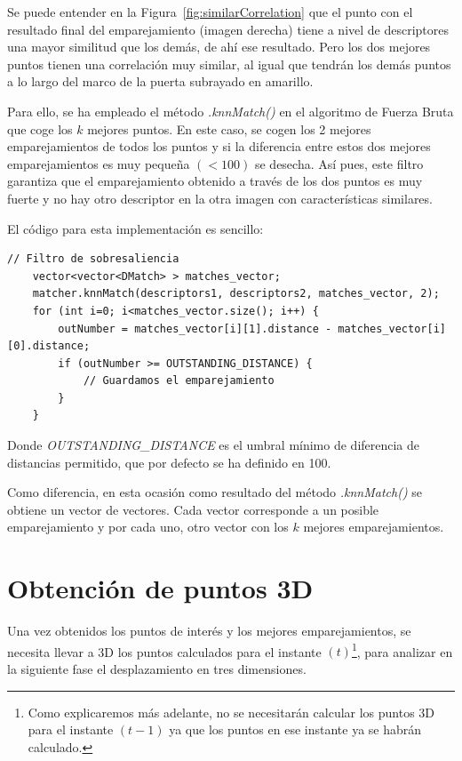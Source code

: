 \begin{itemize}
Se puede entender en la Figura~\ref{fig:similarCorrelation} que el punto con el resultado final del emparejamiento (imagen derecha) tiene a nivel de descriptores una mayor similitud que los demás, de ahí ese resultado. Pero los dos mejores puntos tienen una correlación muy similar, al igual que tendrán los demás puntos a lo largo del marco de la puerta subrayado en amarillo.

Para ello, se ha empleado el método \textit{.knnMatch()} en el algoritmo de Fuerza Bruta que coge los $k$ mejores puntos. En este caso, se cogen los 2 mejores emparejamientos de todos los puntos y si la diferencia entre estos dos mejores emparejamientos es muy pequeña $(< 100)$ se desecha. Así pues, este filtro garantiza que el emparejamiento obtenido a través de los dos puntos es muy fuerte y no hay otro descriptor en la otra imagen con características similares.

El código para esta implementación es sencillo:

\begin{lstlisting}[style=CStyle]
	// Filtro de sobresaliencia
	vector<vector<DMatch> > matches_vector;
	matcher.knnMatch(descriptors1, descriptors2, matches_vector, 2);
	for (int i=0; i<matches_vector.size(); i++) {
		outNumber = matches_vector[i][1].distance - matches_vector[i][0].distance;
		if (outNumber >= OUTSTANDING_DISTANCE) {
			// Guardamos el emparejamiento
		}
	}
\end{lstlisting}

Donde \textit{OUTSTANDING\_DISTANCE} es el umbral mínimo de diferencia de distancias permitido, que por defecto se ha definido en 100.

Como diferencia, en esta ocasión como resultado del método \textit{.knnMatch()} se obtiene un vector de vectores. Cada vector corresponde a un posible emparejamiento y por cada uno, otro vector con los $k$ mejores emparejamientos.

\end{itemize}

\section{Obtención de puntos 3D}

Una vez obtenidos los puntos de interés y los mejores emparejamientos, se necesita llevar a 3D los puntos calculados para el instante $(t)$\footnote{Como explicaremos más adelante, no se necesitarán calcular los puntos 3D para el instante $(t-1)$ ya que los puntos en ese instante ya se habrán calculado.}, para analizar en la siguiente fase el desplazamiento en tres dimensiones.

